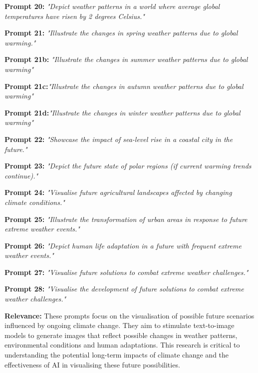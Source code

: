 \begin{description}
\item \textbf{Prompt 20:} \textit{"Depict weather patterns in a world where average global temperatures have risen by 2 degrees Celsius."}
\item \textbf{Prompt 21:} \textit{"Illustrate the changes in spring weather patterns due to global warming."}
        \begin{description}
            \item \textbf{Prompt 21b:} \textit{"Illustrate the changes in summer weather patterns due to global warming"}
            \item \textbf{Prompt 21c:}\textit{"Illustrate the changes in autumn weather patterns due to global warming"}
            \item \textbf{Prompt 21d:}\textit{"Illustrate the changes in winter weather patterns due to global warming"}
        \end{description}
\item \textbf{Prompt 22:} \textit{"Showcase the impact of sea-level rise in a coastal city in the future."}
\item \textbf{Prompt 23:} \textit{"Depict the future state of polar regions (if current warming trends continue)."}
\item \textbf{Prompt 24:} \textit{"Visualise future agricultural landscapes affected by changing climate conditions."}
\item \textbf{Prompt 25:} \textit{"Illustrate the transformation of urban areas in response to future extreme weather events."}
\item \textbf{Prompt 26:} \textit{"Depict human life adaptation in a future with frequent extreme weather events."}
\item \textbf{Prompt 27:} \textit{"Visualise future solutions to combat extreme weather challenges."}
\item \textbf{Prompt 28:} \textit{"Visualise the development of future solutions to combat extreme weather challenges."}
\end{description}

\textbf{Relevance:}
These prompts focus on the visualisation of possible future scenarios influenced by ongoing climate change. They aim to stimulate text-to-image models to generate images that reflect possible changes in weather patterns, environmental conditions and human adaptations. This research is critical to understanding the potential long-term impacts of climate change and the effectiveness of AI in visualising these future possibilities.
